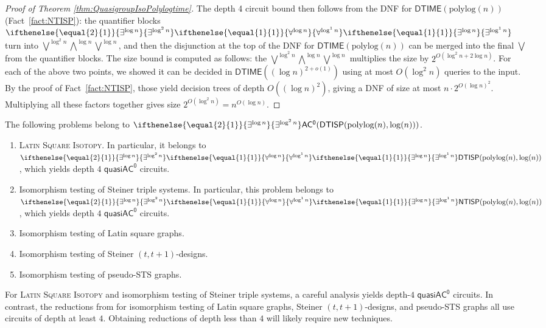 \documentclass{theoretics}
\newcommand{\algprobm}[1]{\textsc{#1}\xspace}
\newcommand{\betacc}[1]{\ifthenelse{\equal{#1}{1}}{\exists^{\log n}}{\exists^{\log^{#1}n}}} %
\newcommand{\alphacc}[1]{\ifthenelse{\equal{#1}{1}}{\forall^{\log n}}{\forall^{\log^{#1}n}}} %
\newcommand{\Oh}{O}
\newcommand*{\ComplexityClass}[1]{\ensuremath{\mathsf{#1}}\xspace}
\newcommand{\NTISP}{\ComplexityClass{NTISP}}
\newcommand{\DTISP}{\ComplexityClass{DTISP}}
\newcommand{\NTISPpll}{\ensuremath{\NTISP(\mathrm{polylog}(n),\mathrm{log}(n))}\xspace}
\newcommand{\DTISPpll}{\ensuremath{\DTISP(\mathrm{polylog}(n),\mathrm{log}(n))}\xspace}
\newcommand{\ACz}{\ComplexityClass{AC^0}}
\newcommand{\qACz}{\ComplexityClass{quasiAC^0}}
\newcommand{\DTIME}{\ComplexityClass{DTIME}}
\begin{document}
\begin{proof}[Proof of Theorem \ref{thm:QuasigroupIsoPolylogtime}]
The depth 4 circuit bound then follows from the DNF for $\DTIME(\text{polylog}(n))$ (Fact~\ref{fact:NTISP}): the quantifier blocks $\betacc{2}\alphacc{1}\betacc{1}$ turn into $\bigvee^{\log^2 n} \bigwedge^{\log n} \bigvee^{\log n}$, and then the disjunction at the top of the DNF for $\DTIME(\text{polylog}(n))$ can be merged into the final $\bigvee$ from the quantifier blocks. The size bound is computed as follows: the $\bigvee^{\log^2 n} \bigwedge^{\log n} \bigvee^{\log n}$ multiplies the size by $2^{\Oh(\log^2 n + 2 \log n)}$. For each of the above two points, we showed it can be decided in $\mathsf{DTIME}((\log n)^{2 + o(1)})$ using at most $\Oh(\log^2 n)$ queries to the input. By the proof of Fact~\ref{fact:NTISP}, those yield decision trees of depth $\Oh((\log n)^2)$, giving a DNF of size at most $n \cdot 2^{\Oh(\log n)^2}$. Multiplying all these factors together gives size $2^{\Oh(\log^2 n)} = n^{\Oh(\log n)}$.
\end{proof}

\begin{corollary} \label{cor:SRGs}
The following problems belong to $\betacc{2}\ACz(\DTISPpll)$.
\begin{enumerate}[label=(\alph*)]
\item \algprobm{Latin Square Isotopy}. In particular, it belongs to \\ $\betacc{2}\alphacc{1}\betacc{1}\DTISPpll$, which yields depth $4$ $\qACz$ circuits.

\item Isomorphism testing of Steiner triple systems. In particular, this problem belongs to \\ $\betacc{2}\alphacc{1}\betacc{1}\NTISPpll$, which yields depth $4$ $\qACz$ circuits.


\item Isomorphism testing of Latin square graphs.
\item Isomorphism testing of Steiner $(t, t+1)$-designs.
\item Isomorphism testing of pseudo-STS graphs.
\end{enumerate}
\end{corollary}

\noindent For \algprobm{Latin Square Isotopy} and isomorphism testing of Steiner triple systems, a careful analysis yields depth-$4$ $\qACz$ circuits. In contrast, the reductions from \cite{LevetLatinSquares} for isomorphism testing of Latin square graphs, Steiner $(t, t+1)$-designs, and pseudo-STS graphs all use circuits of depth at least $4$. Obtaining reductions of depth less than $4$ will likely require new techniques.
\end{document}
